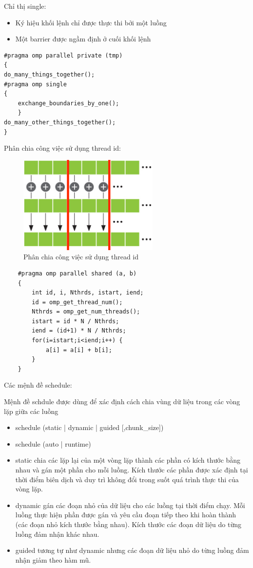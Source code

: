 \documentclass[14pt, a4paper]{article}
\numberwithin{equation}{section}
\numberwithin{figure}{section}
\numberwithin{dl}{section}
\numberwithin{md}{section}
\numberwithin{bd}{section}
\numberwithin{dn}{section}
\numberwithin{hq}{section}
\begin{document}
Chỉ thị single:

\begin{itemize}
    \item Ký hiệu khối lệnh chỉ được thực thi bởi một luồng
    \item Một barrier được ngầm định ở cuối khối lệnh
\end{itemize}
\begin{verbatim}
#pragma omp parallel private (tmp)
{
do_many_things_together();
#pragma omp single
{ 
    exchange_boundaries_by_one(); 
    }
do_many_other_things_together();
}
\end{verbatim}

Phân chia công việc sử dụng thread id:

\begin{figure}[H]
    \centering
    \includegraphics[width=0.3\linewidth]{figures/OpenMP/Distribute.png}
    \caption{Phân chia công việc sử dụng thread id}
\end{figure}
\begin{verbatim}
    #pragma omp parallel shared (a, b)
    {
        int id, i, Nthrds, istart, iend;
        id = omp_get_thread_num();
        Nthrds = omp_get_num_threads();
        istart = id * N / Nthrds;
        iend = (id+1) * N / Nthrds;
        for(i=istart;i<iend;i++) { 
            a[i] = a[i] + b[i]; 
        }
    } 
\end{verbatim}

Các mệnh đề schedule:

Mệnh đề schdule được dùng để xác định cách chia vùng dữ liệu trong các vòng lặp giữa các luồng
\begin{itemize}
    \item schedule (static | dynamic | guided [,chunk\_size])
    \item schedule (auto | runtime)
\end{itemize}
\begin{itemize}
    \item static chia các lặp lại của một vòng lặp thành các phần có kích thước bằng nhau và gán một phần cho mỗi luồng.
    Kích thước các phần được xác định tại thời điểm biên dịch và duy trì không đổi trong suốt quá trình thực thi của vòng lặp.
    \item dynamic gán các đoạn nhỏ của dữ liệu cho các luồng tại thời điểm chạy.
    Mỗi luồng thực hiện phần được gán và yêu cầu đoạn tiếp theo khi hoàn thành (các đoạn nhỏ kích thước bằng nhau).
    Kích thước các đoạn dữ liệu do từng luồng đảm nhận khác nhau.
    \item guided tương tự như dynamic nhưng các đoạn dữ liệu nhỏ do từng luồng đảm nhận giảm theo hàm mũ.
\end{itemize}
\end{document}
